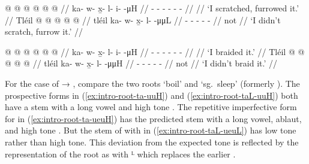 \documentclass[12pt,letterpaper,oneside,article]{memoir}
\begin{document}
\begin{multicols}{2}
\pex\label{ex:intro-root-xit}%
\a\label{ex:intro-root-xit-uH}%
\begingl
	\gla	{} @ {} @ {} @ {} @ {} @ {} @ {} //
	\glb	ka- w- x̱- l- i-  -μH //
	\glc	{}- - - - -  - //
	\gld	{} {} {} {} {} {} {} //
	\glft	‘I scratched, furrowed it.’
		//
\endgl
\a\label{ex:intro-root-xit-uuL}%
\begingl
	\gla	Tléil  @ {} @ {} @ {} @ {} @ {} //
	\glb	tléil ka- w- x̱- l-  -μμL //
	\glc	{} - - - -  - //
	\gld	not  {} {} {} {} {} //
	\glft	‘I didn’t scratch, furrow it.’
		//
\endgl
\xe

\pex\label{ex:intro-root-sit}%
\a\label{ex:intro-root-sit-uH}%
\begingl
	\gla	{} @ {} @ {} @ {} @ {} @ {} @ {} //
	\glb	ka- w- x̱- l- i-  -μH //
	\glc	{}- - - - -  - //
	\gld	{} {} {} {} {} {} {} //
	\glft	‘I braided it.’
		//
\endgl
\a\label{ex:intro-root-sit-uuH}%
\begingl
	\gla	Tléil  @ {} @ {} @ {} @ {} @ {} //
	\glb	tléil ka- w- x̱- l-  -μμH //
	\glc	{} - - - -  - //
	\gld	not  {} {} {} {} {} //
	\glft	‘I didn’t braid it.’
		//
\endgl
\xe
\end{multicols}

For the case of  → , compare the two roots  ‘boil’ and  ‘sg.\ sleep’ (formerly ).
The prospective forms in (\ref{ex:intro-root-ta-uuH}) and (\ref{ex:intro-root-taL-uuH}) both have a stem with a long vowel and high tone .
The repetitive imperfective form for  in (\ref{ex:intro-root-ta-ueuH}) has the predicted stem with a long vowel, ablaut, and high tone .
But the stem of  with  in (\ref{ex:intro-root-taL-ueuL}) has low tone rather than high tone.
This deviation from the expected tone is reflected by the representation of the root as  with ᴸ which replaces the earlier .
\end{document}
